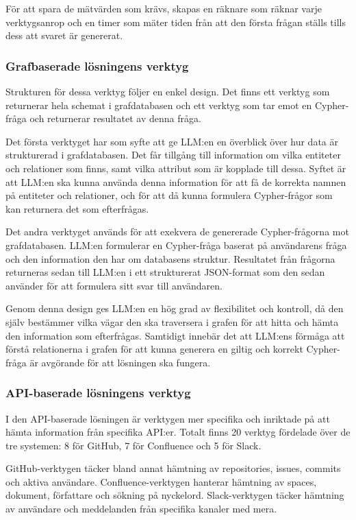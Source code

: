 För att spara de mätvärden som krävs, skapas en räknare som räknar varje verktygsanrop och en timer som mäter tiden från att den första frågan ställs tills dess att svaret är genererat. 

\subsubsection{Grafbaserade lösningens verktyg}
Strukturen för dessa verktyg följer en enkel design.
 Det finns ett verktyg som returnerar hela schemat i grafdatabasen och ett verktyg som tar emot en Cypher-fråga och returnerar resultatet av denna fråga.

Det första verktyget har som syfte att ge LLM:en en överblick över hur data är strukturerad i grafdatabasen.
Det får tillgång till information om vilka entiteter och relationer som finns, samt vilka attribut som är kopplade till dessa.
Syftet är att LLM:en ska kunna använda denna information för att få de korrekta namnen på entiteter och relationer, och för att då kunna formulera Cypher-frågor som kan returnera det som efterfrågas.

Det andra verktyget används för att exekvera de genererade Cypher-frågorna mot grafdatabasen. 
LLM:en formulerar en Cypher-fråga baserat på användarens fråga och den information den har om databasens struktur.
Resultatet från frågorna returneras sedan till LLM:en i ett strukturerat JSON-format som den sedan använder för att formulera sitt svar till användaren.

Genom denna design ges LLM:en en hög grad av flexibilitet och kontroll, då den själv bestämmer vilka vägar den ska traversera i grafen för att hitta och hämta den information som efterfrågas.
Samtidigt innebär det att LLM:ens förmåga att förstå relationerna i grafen för att kunna generera en giltig och korrekt Cypher-fråga är avgörande för att lösningen ska fungera.

\subsubsection{API-baserade lösningens verktyg}\label{subsubsec:apiVerktyg}
I den API-baserade lösningen är verktygen mer specifika och inriktade på att hämta information från specifika API:er.
Totalt finns 20 verktyg fördelade över de tre systemen: 8 för GitHub, 7 för Confluence och 5 för Slack.

GitHub-verktygen täcker bland annat hämtning av repositories, issues, commits och aktiva användare.
Confluence-verktygen hanterar hämtning av spaces, dokument, författare och sökning på nyckelord.
Slack-verktygen täcker hämtning av användare och meddelanden från specifika kanaler med mera.

